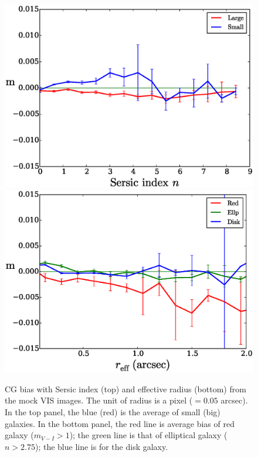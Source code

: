 \documentclass[useAMS,usenatbib]{mnras}
\newcommand{\be}{\begin{equation}}
\newcommand{\ee}{\end{equation}}
\begin{document}
\begin{figure}
\includegraphics[width=\hsize]{z2s-ne29.eps}
\includegraphics[width=\hsize]{z2nscl-re29.eps}
\caption{CG bias with Sersic index (top) and effective radius (bottom)
  from the mock VIS images. The unit of radius is a pixel ($=0.05$
  arcsec). In the top panel, the blue (red) is the average of small
  (big) galaxies. In the bottom panel, the red line is average bias of
  red galaxy ($m_{V-I}>1$); the green line is that of elliptical
  galaxy ($n>2.75$); the blue line is for the disk galaxy.}
\label{fig:cg2re}
\end{figure}
%






\end{document}
